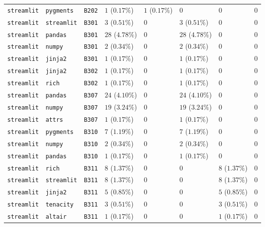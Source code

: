 \begin{table}
\begin{tabular}{llllllll}
\texttt{streamlit} & \texttt{pygments} & \texttt{B202} & $1$ ($0.17\%$) & $1$ ($0.17\%$) & $0$ & $0$ & $0$ \\
\texttt{streamlit} & \texttt{streamlit} & \texttt{B301} & $3$ ($0.51\%$) & $0$ & $3$ ($0.51\%$) & $0$ & $0$ \\
\texttt{streamlit} & \texttt{pandas} & \texttt{B301} & $28$ ($4.78\%$) & $0$ & $28$ ($4.78\%$) & $0$ & $0$ \\
\texttt{streamlit} & \texttt{numpy} & \texttt{B301} & $2$ ($0.34\%$) & $0$ & $2$ ($0.34\%$) & $0$ & $0$ \\
\texttt{streamlit} & \texttt{jinja2} & \texttt{B301} & $1$ ($0.17\%$) & $0$ & $1$ ($0.17\%$) & $0$ & $0$ \\
\texttt{streamlit} & \texttt{jinja2} & \texttt{B302} & $1$ ($0.17\%$) & $0$ & $1$ ($0.17\%$) & $0$ & $0$ \\
\texttt{streamlit} & \texttt{rich} & \texttt{B302} & $1$ ($0.17\%$) & $0$ & $1$ ($0.17\%$) & $0$ & $0$ \\
\texttt{streamlit} & \texttt{pandas} & \texttt{B307} & $24$ ($4.10\%$) & $0$ & $24$ ($4.10\%$) & $0$ & $0$ \\
\texttt{streamlit} & \texttt{numpy} & \texttt{B307} & $19$ ($3.24\%$) & $0$ & $19$ ($3.24\%$) & $0$ & $0$ \\
\texttt{streamlit} & \texttt{attrs} & \texttt{B307} & $1$ ($0.17\%$) & $0$ & $1$ ($0.17\%$) & $0$ & $0$ \\
\texttt{streamlit} & \texttt{pygments} & \texttt{B310} & $7$ ($1.19\%$) & $0$ & $7$ ($1.19\%$) & $0$ & $0$ \\
\texttt{streamlit} & \texttt{numpy} & \texttt{B310} & $2$ ($0.34\%$) & $0$ & $2$ ($0.34\%$) & $0$ & $0$ \\
\texttt{streamlit} & \texttt{pandas} & \texttt{B310} & $1$ ($0.17\%$) & $0$ & $1$ ($0.17\%$) & $0$ & $0$ \\
\texttt{streamlit} & \texttt{rich} & \texttt{B311} & $8$ ($1.37\%$) & $0$ & $0$ & $8$ ($1.37\%$) & $0$ \\
\texttt{streamlit} & \texttt{streamlit} & \texttt{B311} & $8$ ($1.37\%$) & $0$ & $0$ & $8$ ($1.37\%$) & $0$ \\
\texttt{streamlit} & \texttt{jinja2} & \texttt{B311} & $5$ ($0.85\%$) & $0$ & $0$ & $5$ ($0.85\%$) & $0$ \\
\texttt{streamlit} & \texttt{tenacity} & \texttt{B311} & $3$ ($0.51\%$) & $0$ & $0$ & $3$ ($0.51\%$) & $0$ \\
\texttt{streamlit} & \texttt{altair} & \texttt{B311} & $1$ ($0.17\%$) & $0$ & $0$ & $1$ ($0.17\%$) & $0$ \\

\end{tabular}
\end{table}
